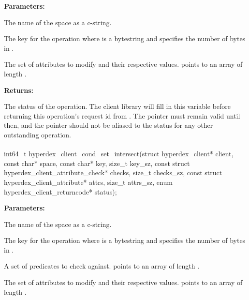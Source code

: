 \noindent\textbf{Parameters:}
\begin{description}[labelindent=\widthof{{\code{attrs}, \code{attrs\_sz}}},leftmargin=*,noitemsep,nolistsep,align=right]
\item[\code{space}] The name of the space as a c-string.
\item[\code{key}, \code{key\_sz}] The key for the operation where  is a bytestring and  specifies the number of bytes in .
\item[\code{attrs}, \code{attrs\_sz}] The set of attributes to modify and their respective values.   points to an array of length .
\end{description}

\noindent\textbf{Returns:}
\begin{description}[labelindent=\widthof{{\code{status}}},leftmargin=*,noitemsep,nolistsep,align=right]
\item[\code{status}] The status of the operation.  The client library will fill in this variable before returning this operation's request id from .  The pointer must remain valid until then, and the pointer should not be aliased to the status for any other outstanding operation.
\end{description}

\paragraph{}
\label{api:c:cond_set_intersect}
\begin{ccode}
int64_t hyperdex_client_cond_set_intersect(struct hyperdex_client* client,
        const char* space,
        const char* key, size_t key_sz,
        const struct hyperdex_client_attribute_check* checks, size_t checks_sz,
        const struct hyperdex_client_attribute* attrs, size_t attrs_sz,
        enum hyperdex_client_returncode* status);
\end{ccode}
\funcdesc 

\noindent\textbf{Parameters:}
\begin{description}[labelindent=\widthof{{\code{checks}, \code{checks\_sz}}},leftmargin=*,noitemsep,nolistsep,align=right]
\item[\code{space}] The name of the space as a c-string.
\item[\code{key}, \code{key\_sz}] The key for the operation where  is a bytestring and  specifies the number of bytes in .
\item[\code{checks}, \code{checks\_sz}] A set of predicates to check against.   points to an array of length .
\item[\code{attrs}, \code{attrs\_sz}] The set of attributes to modify and their respective values.   points to an array of length .
\end{description}

